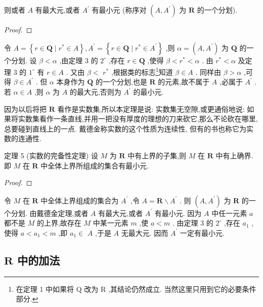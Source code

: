 则或者 \(A\) 有最大元,或者 \({A}^{\prime }\) 有最小元 (称序对 \(\left( {A,{A}^{\prime }}\right)\) 为 \(\mathbf{R}\) 的一个分划).

\begin{proof}

\end{proof}
令 \(A = \left\{  {r \in  \mathbf{Q} \mid  {r}^{ * } \in  A}\right\}  ,{A}^{\prime } = \left\{  {r \in  \mathbf{Q} \mid  {r}^{ * } \in  {A}^{\prime }}\right\}\) ,则 \(\alpha  = \left( {A,{A}^{\prime }}\right)\) 为 \(\mathbf{Q}\) 的一个分划. 设 \(\beta  < \alpha\) ,由定理 3 的 \({2}^{ \circ  }\) ,存在 \(r \in  \mathbf{Q}\) ,使得 \(\beta  < {r}^{ * } < \alpha\) . 由 \({r}^{ * } < \alpha\) 及定理 3 的 \({1}^{ \circ  }\) 有 \(r \in  A\) . 又由 \(\beta  <\)  \({r}^{ * }\) ,根据类的标志\footnote{在定理 1 中如果将 \(\mathrm{Q}\) 改为 \(\mathrm{R}\) ,其结论仍然成立. 当然这里只用到它的必要条件部分.}知道 \(\beta  \in  A\) . 同样由 \(\beta  > \alpha\) ,可得 \(\beta  \in  {A}^{\prime }\) . 但 \(\alpha\) 本身作为 \(\mathbf{Q}\) 的一个分划,也是 \(\mathbf{R}\) 的元素,故不属于 \(A\) ,必属于 \({A}^{\prime }\) . 若 \(\alpha  \in  A\) ,则 \(\alpha\) 为 \(A\) 的最大元,否则为 \({A}^{\prime }\) 的最小元.

因为以后将把 \(\mathbf{R}\) 看作是实数集,所以本定理是说: 实数集无空隙,或更通俗地说: 如果将实数集看作一条直线,并用一把没有厚度的理想的刀来砍它,那么不论砍在哪里, 总要碰到直线上的一点. 戴德金称实数的这个性质为连续性, 但有的书也称它为实数的连通性.

定理 5 (实数的完备性定理) 设 \(M\) 为 \(\mathbf{R}\) 中有上界的子集,则 \(M\) 在 \(\mathbf{R}\) 中有上确界. 即 \(M\) 在 \(\mathbf{R}\) 中全体上界所组成的集合有最小元.

\begin{proof}

\end{proof}
令 \(M\) 在 \(\mathbf{R}\) 中全体上界组成的集合为 \({A}^{\prime }\) ,令 \(A = \mathbf{R} \smallsetminus  {A}^{\prime }\) . 则 \(\left( {A,{A}^{\prime }}\right)\) 为 \(\mathbf{R}\) 的一个分划. 由戴德金定理,或者 \(A\) 有最大元,或者 \({A}^{\prime }\) 有最小元. 因为 \(A\) 中任一元素 \(a\) 都不是 \(M\) 的上界,故存在 \(M\) 中某一元素 \(m\) ,使 \(a < m\) . 由定理 3 的 \({2}^{ \circ  }\) ,存在 \({a}_{1}\) ,使得 \(a < {a}_{1} < m\) ,即 \({a}_{1} \in\)  \(A\) ,于是 \(A\) 无最大元. 因而 \({A}^{\prime }\) 一定有最小元.

\subsection{ \(\mathbf{R}\) 中的加法}

